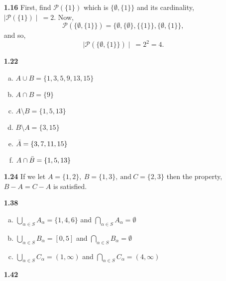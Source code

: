 \documentclass[12pt]{article}
\newcommand{\pow}[1]{ \mathcal{P}\left(#1\right) }
\begin{document}
\begin{itemize}
    \item[\bf{1.16}] First, find $\pow{\{1\}}$ which is $\{\emptyset,\{1\}\}$ and its cardinality, $\mid \pow{\{1\}} \mid \: = 2.$ Now, 
        \begin{equation*}
            \pow{\{\emptyset, \{1\}\}}=\{\emptyset,\{\emptyset\},\{\{1\}\},\{\emptyset,\{1\}\},
        \end{equation*}
    and so,
        \begin{equation*}
            \mid \pow{\{\emptyset, \{1\}\}} \mid \: = 2^2 = 4.
        \end{equation*}
    
    \item[\bf{1.22}]
        
        \begin{enumerate}[(a)]
            \item $ A \cup B=\{1,3,5,9,13,15\}$
            \item $ A\cap B=\{9\}$
            \item $ A\setminus B=\{1,5,13\}$
            \item $ B \setminus A = \{ 3, 15\}$
            \item $ \Bar{A}= \{3,7,11,15\}$
            \item $ A \cap \Bar{B}=\{1,5,13\}$
        \end{enumerate}

    \item[\bf{1.24}] If we let $A=\{1,2\}, \ B=\{1,3\},\ \text{and} \ C=\{2,3\} $ then the property, $ B-A=C-A$ is satisfied.
    
    \item[\bf{1.38}]
    
        \begin{enumerate}[(a)]
            \item $\bigcup_{\alpha \in S}A_{\alpha}=\{1,4,6\}$ and $\bigcap_{\alpha \in S}A_{\alpha}=\emptyset$
            \item $\bigcup_{\alpha \in S}B_{\alpha}=[0,5]$ and $\bigcap_{\alpha \in S}B_{\alpha}=\emptyset$
            \item $\bigcup_{\alpha \in S}C_{\alpha}=(1, \infty)$ and $\bigcap_{\alpha \in S}C_{\alpha}=(4, \infty)$
        \end{enumerate}
        
    \item[\bf{1.42}]
    

\end{itemize}
\end{document}
